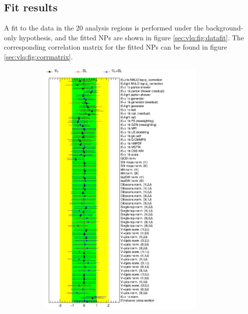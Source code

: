 \subsection{Fit results}
\label{sec:fit:vlqdatafit}
A fit to the data in the 20 analysis regions is performed under the background-only hypothesis, and the fitted NPs are shown in figure \ref{sec:vlq:fig:datafit}. The corresponding correlation matrix for the fitted NPs can be found in figure \ref{sec:vlq:fig:corrmatrix}.

\begin{figure}[htb!]
\begin{subfigure}{0.5\textwidth}
  \centering
  \includegraphics[width=0.9\textwidth]{figures/VLQ/NuisPar_comp_Backgrounduncertainties_Data.png}
  \caption*{}
  \label{}
\end{subfigure}
\begin{subfigure}{0.5\textwidth}

\end{subfigure}
\end{figure}
